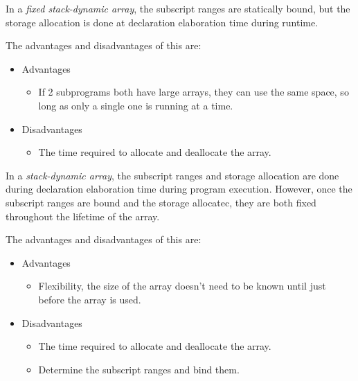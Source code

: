 \begin{definition}\label{def:Fixed_Stack_Dynamic_Array}
  In a \emph{fixed stack-dynamic array}, the subscript ranges are statically bound, but the storage allocation is done at declaration elaboration time during runtime.

  The advantages and disadvantages of this are:
  \begin{itemize}[nosep,noitemsep]
  \item Advantages
    \begin{itemize}[nosep,noitemsep]
    \item If 2 subprograms both have large arrays, they can use the same space, so long as only a single one is running at a time.
    \end{itemize}
  \item Disadvantages
    \begin{itemize}[nosep,noitemsep]
    \item The time required to allocate and deallocate the array.
    \end{itemize}
  \end{itemize}
\end{definition}

\begin{definition}\label{def:Stack_Dynamic_Array}
  In a \emph{stack-dynamic array}, the subscript ranges and storage allocation are done during declaration elaboration time during program execution.
  However, once the subscript ranges are bound and the storage allocatec, they are both fixed throughout the lifetime of the array.

  The advantages and disadvantages of this are:
  \begin{itemize}[nosep,noitemsep]
  \item Advantages
    \begin{itemize}[nosep,noitemsep]
    \item Flexibility, the size of the array doesn't need to be known until just before the array is used.
    \end{itemize}
  \item Disadvantages
    \begin{itemize}[nosep,noitemsep]
    \item The time required to allocate and deallocate the array.
    \item Determine the subscript ranges and bind them.
    \end{itemize}
  \end{itemize}
\end{definition}


